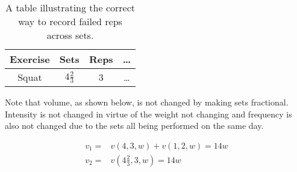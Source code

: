 \begin{table}[h]
    \centering
    \begin{tabular}{c|c|c|c}
        Exercise & Sets & Reps & \dots \\
        \hline
        Squat & $4\frac{2}{3}$ & 3 & \dots \\
    \end{tabular}
    \caption{A table illustrating the correct way to record failed reps across sets.}
    \label{tab:FailedSetExampleCorrectData}
\end{table}

Note that volume, as shown below, is not changed by making sets fractional. Intensity is not changed in virtue of the weight not changing and frequency is also not changed due to the sets all being performed on the same day.

\begin{equation*}
    \begin{split}
        v_1=&v(4,3,w)+v(1,2,w)=14w \\
        v_2=&v\left(4\frac{2}{3},3,w\right)=14w \\
    \end{split}
\end{equation*}